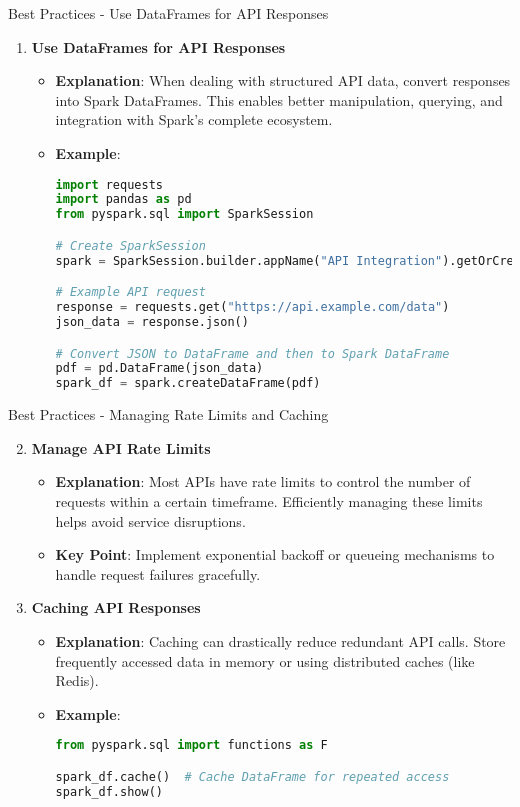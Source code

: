 \documentclass[aspectratio=169]{beamer}
\begin{document}
\begin{frame}[fragile]{Best Practices - Use DataFrames for API Responses}
    \begin{enumerate}
        \item \textbf{Use DataFrames for API Responses}
        \begin{itemize}
            \item \textbf{Explanation}: When dealing with structured API data, convert responses into Spark DataFrames. This enables better manipulation, querying, and integration with Spark's complete ecosystem.
            \item \textbf{Example}:
            \begin{lstlisting}[language=Python]
import requests
import pandas as pd
from pyspark.sql import SparkSession

# Create SparkSession
spark = SparkSession.builder.appName("API Integration").getOrCreate()

# Example API request
response = requests.get("https://api.example.com/data")
json_data = response.json()

# Convert JSON to DataFrame and then to Spark DataFrame
pdf = pd.DataFrame(json_data)
spark_df = spark.createDataFrame(pdf)
            \end{lstlisting}
        \end{itemize}
    \end{enumerate}
\end{frame}

\begin{frame}{Best Practices - Managing Rate Limits and Caching}
    \begin{enumerate}
        \setcounter{enumi}{1}
        \item \textbf{Manage API Rate Limits}
        \begin{itemize}
            \item \textbf{Explanation}: Most APIs have rate limits to control the number of requests within a certain timeframe. Efficiently managing these limits helps avoid service disruptions.
            \item \textbf{Key Point}: Implement exponential backoff or queueing mechanisms to handle request failures gracefully.
        \end{itemize}
        
        \item \textbf{Caching API Responses}
        \begin{itemize}
            \item \textbf{Explanation}: Caching can drastically reduce redundant API calls. Store frequently accessed data in memory or using distributed caches (like Redis).
            \item \textbf{Example}:
            \begin{lstlisting}[language=Python]
from pyspark.sql import functions as F

spark_df.cache()  # Cache DataFrame for repeated access
spark_df.show()
            \end{lstlisting}
        \end{itemize}
    \end{enumerate}
\end{frame}
\end{document}
